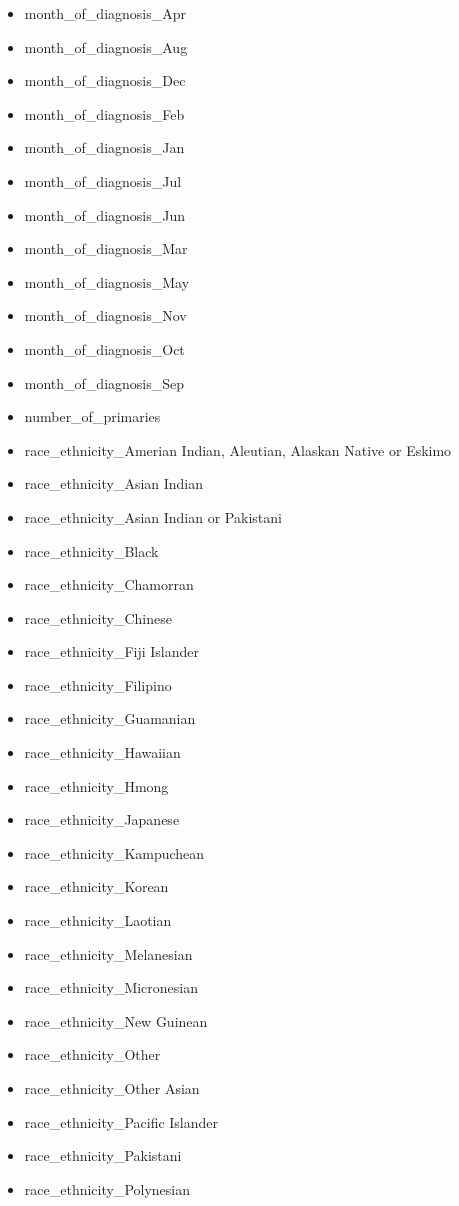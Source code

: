 \documentclass[10pt,letterpaper]{article}
\begin{document}
\begin{itemize}[noitemsep]
\item month\_of\_diagnosis\_Apr
\item month\_of\_diagnosis\_Aug
\item month\_of\_diagnosis\_Dec
\item month\_of\_diagnosis\_Feb
\item month\_of\_diagnosis\_Jan
\item month\_of\_diagnosis\_Jul
\item month\_of\_diagnosis\_Jun
\item month\_of\_diagnosis\_Mar
\item month\_of\_diagnosis\_May
\item month\_of\_diagnosis\_Nov
\item month\_of\_diagnosis\_Oct
\item month\_of\_diagnosis\_Sep
\item number\_of\_primaries
\item race\_ethnicity\_Amerian Indian, Aleutian, Alaskan Native or Eskimo
\item race\_ethnicity\_Asian Indian
\item race\_ethnicity\_Asian Indian or Pakistani
\item race\_ethnicity\_Black
\item race\_ethnicity\_Chamorran
\item race\_ethnicity\_Chinese
\item race\_ethnicity\_Fiji Islander
\item race\_ethnicity\_Filipino
\item race\_ethnicity\_Guamanian
\item race\_ethnicity\_Hawaiian
\item race\_ethnicity\_Hmong
\item race\_ethnicity\_Japanese
\item race\_ethnicity\_Kampuchean
\item race\_ethnicity\_Korean
\item race\_ethnicity\_Laotian
\item race\_ethnicity\_Melanesian
\item race\_ethnicity\_Micronesian
\item race\_ethnicity\_New Guinean
\item race\_ethnicity\_Other
\item race\_ethnicity\_Other Asian
\item race\_ethnicity\_Pacific Islander
\item race\_ethnicity\_Pakistani
\item race\_ethnicity\_Polynesian

\end{itemize}
\end{document}
